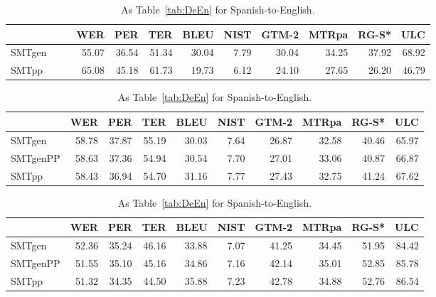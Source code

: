 \documentclass[a4paper,11pt]{article}
\begin{document}
\begin{table}[t]
\small
{}
\begin{tabular}{lrrrrrrrrr}
\toprule
         & WER   &  PER  & TER   &  BLEU & NIST & GTM-2 & MTRpa & RG-S* & ULC \\
\midrule
SMTgen~~~~ & 55.07 & 36.54 & 51.34 & 30.04 & 7.79 & 30.04 & 34.25 & 37.92 & 68.92 \\  
SMTpp	   & 65.08 & 45.18 & 61.73 & 19.73 & 6.12 & 24.10 & 27.65 & 26.20 & 46.79 \\  
\bottomrule
\end{tabular}

\begin{tabular}{lrrrrrrrrr}
\toprule
         & WER   &  PER  & TER   &  BLEU & NIST & GTM-2 & MTRpa & RG-S* & ULC \\
\midrule
SMTgen	 & 58.78 & 37.87 & 55.19 & 30.03 & 7.64 & 26.87 & 32.58 & 40.46 & 65.97 \\  
SMTgenPP & 58.63 & 37.36 & 54.94 & 30.54 & 7.70 & 27.01 & 33.06 & 40.87 & 66.87 \\  
SMTpp	 & 58.43 & 36.94 & 54.70 & 31.16 & 7.77 & 27.43 & 32.75 & 41.24 & 67.62 \\  
\bottomrule
\end{tabular}


\begin{tabular}{lrrrrrrrrr}
\toprule
         & WER   &  PER  & TER   &  BLEU & NIST & GTM-2 & MTRpa & RG-S* & ULC \\
\midrule
SMTgen	 & 52.36 & 35.24 & 46.16 & 33.88 & 7.07 & 41.25 & 34.45 & 51.95 & 84.42 \\  
SMTgenPP & 51.55 & 35.10 & 45.16 & 34.86 & 7.16 & 42.14 & 35.01 & 52.85 & 85.78 \\  
SMTpp	 & 51.32 & 34.35 & 44.50 & 35.88 & 7.23 & 42.78 & 34.88 & 52.76 & 86.54 \\  
\bottomrule
\end{tabular}
 \caption{As Table~\ref{tab:DeEn} for Spanish-to-English.}
 \label{tab:EsEn}
\end{table}
\end{document}
